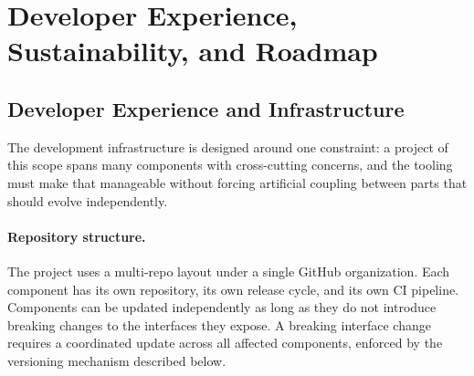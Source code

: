 \section{Developer Experience, Sustainability, and Roadmap}
\label{sec:sustainability}

\subsection{Developer Experience and Infrastructure}
\label{sec:devex}

The development infrastructure is designed around one constraint: a project of
this scope spans many components with cross-cutting concerns, and the tooling
must make that manageable without forcing artificial coupling between parts
that should evolve independently.

\paragraph{Repository structure.}
The project uses a multi-repo layout under a single GitHub organization. Each
component has its own repository, its own release cycle, and its own CI
pipeline. Components can be updated independently as long as they do not
introduce breaking changes to the interfaces they expose. A breaking interface
change requires a coordinated update across all affected components, enforced
by the versioning mechanism described below.


